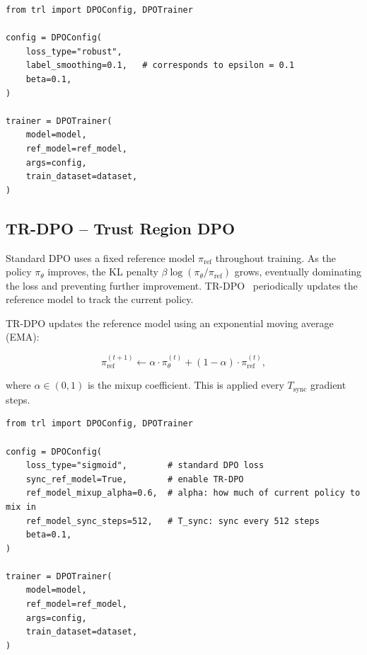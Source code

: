 \begin{examplebox}
\begin{lstlisting}[style=pythonstyle]
from trl import DPOConfig, DPOTrainer

config = DPOConfig(
    loss_type="robust",
    label_smoothing=0.1,   # corresponds to epsilon = 0.1
    beta=0.1,
)

trainer = DPOTrainer(
    model=model,
    ref_model=ref_model,
    args=config,
    train_dataset=dataset,
)
\end{lstlisting}
\end{examplebox}

\subsection{TR-DPO -- Trust Region DPO}
\label{sec:tr-dpo}

\begin{intuitionbox}
Standard DPO uses a fixed reference model $\pi_{\text{ref}}$ throughout training. As the policy $\pi_\theta$ improves, the KL penalty $\beta \log(\pi_\theta/\pi_{\text{ref}})$ grows, eventually dominating the loss and preventing further improvement. TR-DPO~\cite{gorbatenko2024trdpo} periodically updates the reference model to track the current policy.
\end{intuitionbox}

TR-DPO updates the reference model using an exponential moving average (EMA):

\[
\pi_{\text{ref}}^{(t+1)} \leftarrow
    \alpha \cdot \pi_\theta^{(t)} + (1-\alpha) \cdot \pi_{\text{ref}}^{(t)},
\]

where $\alpha \in (0,1)$ is the mixup coefficient. This is applied every $T_{\text{sync}}$ gradient steps.

\begin{examplebox}
\begin{lstlisting}[style=pythonstyle]
from trl import DPOConfig, DPOTrainer

config = DPOConfig(
    loss_type="sigmoid",        # standard DPO loss
    sync_ref_model=True,        # enable TR-DPO
    ref_model_mixup_alpha=0.6,  # alpha: how much of current policy to mix in
    ref_model_sync_steps=512,   # T_sync: sync every 512 steps
    beta=0.1,
)

trainer = DPOTrainer(
    model=model,
    ref_model=ref_model,
    args=config,
    train_dataset=dataset,
)
\end{lstlisting}
\end{examplebox}

